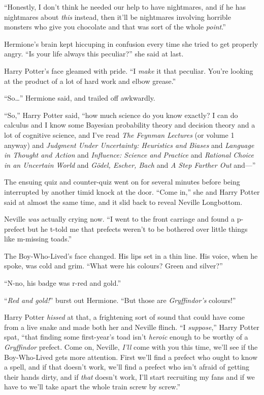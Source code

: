 “Honestly, I don’t think he needed our help to have nightmares, and if he has nightmares about \emph{this} instead, then it’ll be nightmares involving horrible monsters who give you chocolate and that was sort of the whole \emph{point}.”

Hermione’s brain kept hiccuping in confusion every time she tried to get properly angry. “Is your life always this peculiar?” she said at last.

Harry Potter’s face gleamed with pride. “I \emph{make} it that peculiar. You’re looking at the product of a lot of hard work and elbow grease.”

“So…” Hermione said, and trailed off awkwardly.

“So,” Harry Potter said, “how much science do you know exactly? I can do calculus and I know some Bayesian probability theory and decision theory and a lot of cognitive science, and I’ve read \emph{The Feynman Lectures} (or volume 1 anyway) and \emph{Judgment Under Uncertainty: Heuristics and Biases} and \emph{Language in Thought and Action} and \emph{Influence: Science and Practice} and \emph{Rational Choice in an Uncertain World} and \emph{Gödel, Escher, Bach} and \emph{A Step Farther Out} and—”

The ensuing quiz and counter-quiz went on for several minutes before being interrupted by another timid knock at the door. “Come in,” she and Harry Potter said at almost the same time, and it slid back to reveal Neville Longbottom.

Neville \emph{was} actually crying now. “I went to the front carriage and found a p-prefect but he t-told me that prefects weren’t to be bothered over little things like m-missing toads.”

The Boy-Who-Lived’s face changed. His lips set in a thin line. His voice, when he spoke, was cold and grim. “What were his colours? Green and silver?”

“N-no, his badge was r-red and gold.”

“\emph{Red and gold!}” burst out Hermione. “But those are \emph{Gryffindor’s} colours!”

Harry Potter \emph{hissed} at that, a frightening sort of sound that could have come from a live snake and made both her and Neville flinch. “I \emph{suppose},” Harry Potter spat, “that finding some first-year’s toad isn’t \emph{heroic} enough to be worthy of a \emph{Gryffindor} prefect. Come on, Neville, \emph{I’ll} come with you this time, we’ll see if the Boy-Who-Lived gets more attention. First we’ll find a prefect who ought to know a spell, and if that doesn’t work, we’ll find a prefect who isn’t afraid of getting their hands dirty, and if \emph{that} doesn’t work, I’ll start recruiting my fans and if we have to we’ll take apart the whole train screw by screw.”

